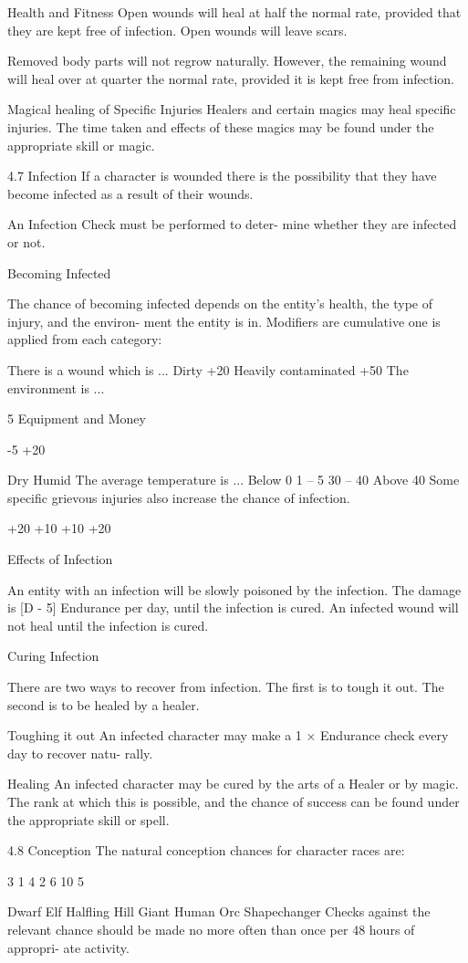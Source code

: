 \begin{Chapter}{Health and Fitness}
Open  wounds  will  heal  at  half  the  normal  rate, 
provided that they are kept free  of infection. Open 
wounds will leave scars. 

Removed  body  parts  will  not  regrow  naturally. 
However,  the  remaining  wound  will  heal  over  at 
quarter  the  normal  rate,  provided  it  is  kept  free 
from infection. 

Magical  healing of  Specific  Injuries  Healers  and 
certain magics may heal specific injuries. The time 
taken  and  effects  of  these  magics  may  be  found 
under the appropriate skill or magic. 

4.7 Infection 
If  a  character  is  wounded  there  is  the  possibility 
that they  have  become  infected  as  a result  of  their 
wounds. 

An  Infection  Check  must  be  performed  to  deter-
mine whether they are infected or not. 

Becoming Infected 

The  chance  of  becoming  infected  depends  on  the 
entity’s health, the type of injury, and the environ-
ment the entity is in. Modifiers are cumulative one 
is applied from each category: 

There is a wound which is ... 
Dirty 
+20%
Heavily contaminated  +50%
The environment is ... 

5 Equipment and Money 

-5%
+20%

Dry 
Humid 
The average temperature is ... 
Below 0 
1 – 5 
30 – 40 
Above 40 
Some  specific  grievous  injuries  also  increase  the 
chance of infection. 

+20%
+10%
+10%
+20%

Effects of Infection 

An entity with an infection will be slowly poisoned 
by the infection. The damage is [D - 5] Endurance 
per  day,  until  the  infection  is  cured.  An  infected 
wound will not heal until the infection is cured. 

Curing Infection 

There are two ways to recover from infection. The 
first  is  to  tough  it  out.  The  second  is  to  be  healed 
by a healer. 

Toughing it out An infected character may make a 
1  ×  Endurance  check  every  day  to  recover  natu-
rally. 

Healing An infected character may be cured by the 
arts of a Healer or by magic. The rank at which this 
is possible, and the chance of success can be found 
under the appropriate skill or spell. 

4.8 Conception 
The natural conception chances for character races 
are:  

3%
1%
4%
2%
6%
10%
5%

Dwarf 
Elf 
Halﬂing 
Hill Giant 
Human 
Orc 
Shapechanger 
Checks against the relevant chance should be made 
no more often than once per 48 hours of appropri-
ate activity. 
\end{Chapter}
